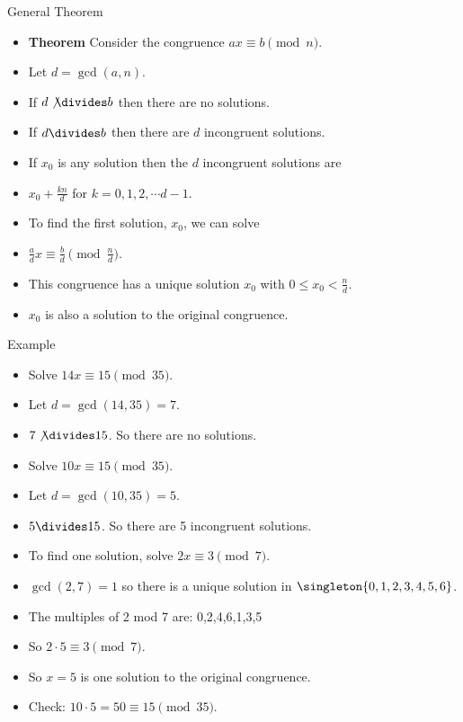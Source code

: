 \documentclass{beamer}
\begin{document}
\begin{frame}{General Theorem}
\begin{itemize}
  \item \textbf{Theorem} Consider the congruence $ax\equiv b \pmod n$.
  \item Let $d=\gcd(a,n)$.
  \item If $d\not\divides b$ then there are no solutions.
  \item If $d\divides b$ then there are $d$ incongruent solutions.
  \item If $x_0$ is any solution then the $d$ incongruent solutions are
  \item $x_0 + \frac{kn}{d}$ for $k=0,1,2,\cdots d-1$.
  \item To find the first solution, $x_0$,  we can solve
  \item $\frac{a}{d}x \equiv \frac{b}{d} \pmod {\frac{n}{d}}$.
  \item This congruence has a unique solution $x_0$ with $0\leq x_0 < \frac{n}{d}$.
  \item $x_0$ is also a solution to the original congruence.
\end{itemize}
\end{frame}

\begin{frame}{Example}
\begin{itemize}
  \item Solve $14x \equiv 15 \pmod {35}$.
  \item Let $d=\gcd(14,35) = 7$.
  \item $7\not\divides 15$. So there are no solutions.
  \item Solve $10x \equiv 15 \pmod {35}$.
  \item Let $d=\gcd(10,35) = 5$.
  \item $5\divides 15$. So there are 5 incongruent solutions.
  \item To find one solution, solve $2x \equiv 3 \pmod 7$.
  \item $\gcd(2,7) = 1$ so there is a unique solution in $\singleton{0,1,2,3,4,5,6}$.
  \item The multiples of 2 mod 7 are: 0,2,4,6,1,3,5
  \item So $2\cdot 5 \equiv 3 \pmod 7$.
  \item So $x=5$ is one solution to the original congruence.
  \item Check: $10\cdot 5 = 50 \equiv 15 \pmod {35}$.
\end{itemize}
\end{frame}
\end{document}

